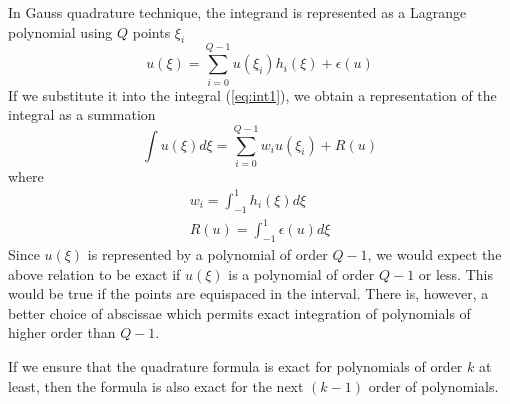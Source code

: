 \documentclass{report}
\begin{document}
\begin{appendices}

In Gauss quadrature technique, the integrand is represented as a Lagrange polynomial
using $Q$ points $\xi_i$
$$
u(\xi) = \sum_{i=0}^{Q-1} u(\xi_i) h_i(\xi) + \epsilon(u)
$$
If we substitute it into the integral (\ref{eq:int1}), we obtain
a representation of the integral as a summation
$$
\int u(\xi) d\xi = \sum_{i=0}^{Q-1} w_i u(\xi_i) + R(u)
$$
where
$$
\begin{array}{l}
w_i = \int_{-1}^1 h_i(\xi) d\xi \\
R(u) = \int_{-1}^1 \epsilon(u) d\xi
\end{array}
$$
Since $u(\xi)$ is represented by a polynomial of order $Q-1$,
we would expect the above relation to be exact if $u(\xi)$ 
is a polynomial of order $Q-1$ or less.
This would be true if the points are equispaced in the interval.
There is, however, a better choice of abscissae which permits exact 
integration of polynomials of higher order than $Q-1$.

If we ensure that the quadrature formula is exact for polynomials of order $k$
at least, then the formula is also exact for the next $(k-1)$ order of polynomials.




\end{appendices}
\end{document}
